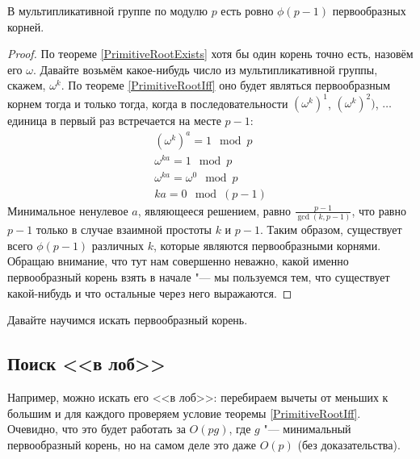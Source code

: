 \begin{theorem}
В мультипликативной группе по модулю $p$ есть ровно $\phi(p-1)$ первообразных корней.
\end{theorem}
\begin{proof}
По теореме \ref{PrimitiveRootExists} хотя бы один корень точно есть, назовём его $\omega$.
Давайте возьмём какое-нибудь число из мультипликативной группы, скажем, $\omega^k$.
По теореме \ref{PrimitiveRootIff} оно будет являться первообразным корнем тогда и только тогда, когда в последовательности $(\omega^k)^1$, $(\omega^k)^2)$, $\dots$ единица в первый раз встречается на месте $p-1$:
\begin{gather*}
(\omega^k)^a = 1 \mod p \\
\omega^{ka} = 1 \mod p \\
\omega^{ka} = \omega^0 \mod p \\
ka = 0 \mod (p-1)
\end{gather*}
Минимальное ненулевое $a$, являющееся решением, равно $\frac{p-1}{\gcd(k, p-1)}$, что равно $p-1$ только в случае взаимной простоты $k$ и $p-1$.
Таким образом, существует всего $\phi(p-1)$ различных $k$, которые являются первообразными корнями.
Обращаю внимание, что тут нам совершенно неважно, какой именно первообразный корень взять в начале "--- мы пользуемся тем, что существует какой-нибудь и что остальные через него выражаются.
\end{proof}

Давайте научимся искать первообразный корень.
\subsection{Поиск <<в лоб>>}
	Например, можно искать его <<в лоб>>: перебираем вычеты от меньших к большим и для каждого проверяем условие теоремы \ref{PrimitiveRootIff}.
	Очевидно, что это будет работать за $O(pg)$, где $g$ "--- минимальный первообразный корень, но на самом деле это даже $O(p)$ (без доказательства).

